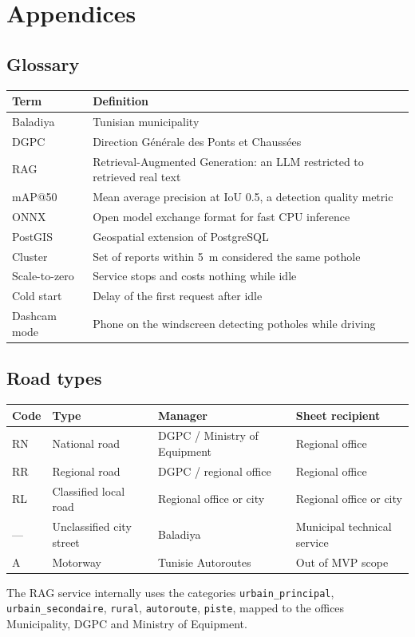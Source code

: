 \documentclass[11pt,a4paper,oneside]{report}
\begin{document}
\appendix
\chapter{Appendices}
\section{Glossary}
\begin{longtable}{@{}L{3.4cm}L{10.6cm}@{}}
\toprule\textbf{Term} & \textbf{Definition}\\\midrule\endhead
Baladiya & Tunisian municipality\\
DGPC & Direction G\'en\'erale des Ponts et Chauss\'ees\\
RAG & Retrieval-Augmented Generation: an LLM restricted to retrieved real text\\
mAP@50 & Mean average precision at IoU 0.5, a detection quality metric\\
ONNX & Open model exchange format for fast CPU inference\\
PostGIS & Geospatial extension of PostgreSQL\\
Cluster & Set of reports within 5~m considered the same pothole\\
Scale-to-zero & Service stops and costs nothing while idle\\
Cold start & Delay of the first request after idle\\
Dashcam mode & Phone on the windscreen detecting potholes while driving\\\bottomrule
\end{longtable}

\section{Road types}
\begin{longtable}{@{}L{1.4cm}L{3.8cm}L{4.4cm}L{4.4cm}@{}}
\toprule\textbf{Code} & \textbf{Type} & \textbf{Manager} & \textbf{Sheet recipient}\\\midrule\endhead
RN & National road & DGPC / Ministry of Equipment & Regional office\\
RR & Regional road & DGPC / regional office & Regional office\\
RL & Classified local road & Regional office or city & Regional office or city\\
--- & Unclassified city street & Baladiya & Municipal technical service\\
A & Motorway & Tunisie Autoroutes & Out of MVP scope\\\bottomrule
\end{longtable}
The RAG service internally uses the categories \texttt{urbain\_principal}, \texttt{urbain\_secondaire},
\texttt{rural}, \texttt{autoroute}, \texttt{piste}, mapped to the offices Municipality, DGPC and Ministry of Equipment.
\end{document}

